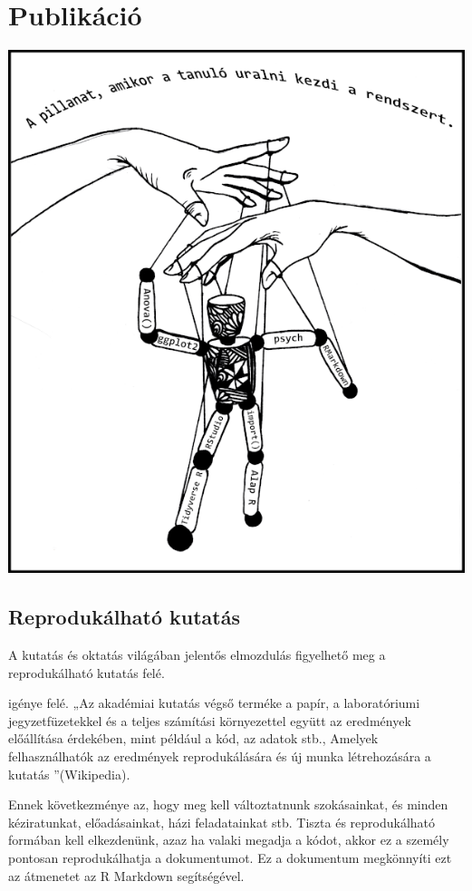 \documentclass[
]{book}
\begin{document}
\hypertarget{publikacio}{%
\chapter{Publikáció}\label{publikacio}}

\begin{center}\includegraphics[width=0.7\linewidth]{images/ch_11_small} \end{center}

\hypertarget{reprodukuxe1lhatuxf3-kutatuxe1s}{%
\section{Reprodukálható kutatás}\label{reprodukuxe1lhatuxf3-kutatuxe1s}}

A kutatás és oktatás világában jelentős elmozdulás figyelhető meg a reprodukálható kutatás felé.

igénye felé. „Az akadémiai kutatás végső terméke a papír, a laboratóriumi jegyzetfüzetekkel és a teljes számítási környezettel együtt az eredmények előállítása érdekében, mint például a kód, az adatok stb., Amelyek felhasználhatók az eredmények reprodukálására és új munka létrehozására a kutatás ''(Wikipedia).

Ennek következménye az, hogy meg kell változtatnunk szokásainkat, és minden kéziratunkat, előadásainkat, házi feladatainkat stb. Tiszta és reprodukálható formában kell elkezdenünk, azaz ha valaki megadja a kódot, akkor ez a személy pontosan reprodukálhatja a dokumentumot. Ez a dokumentum megkönnyíti ezt az átmenetet az R Markdown segítségével.
\end{document}
